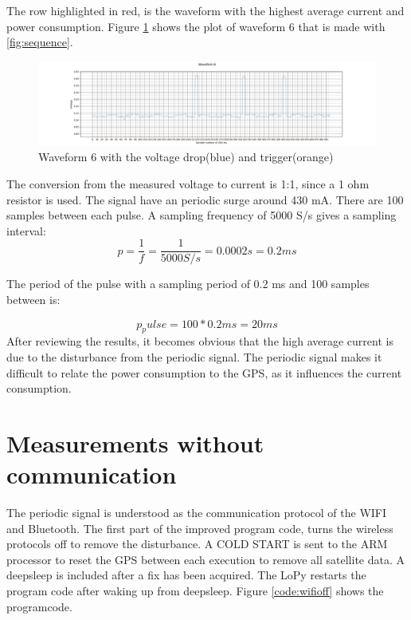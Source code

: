 The row highlighted in red, is the waveform with the highest average current and power consumption.
Figure \ref{fig:startup_intial} shows the plot of waveform 6 that is made with \ref{fig:sequence}.


 \begin{figure}[H]
\centering
\includegraphics[width=18 cm]{Project_Report/Images/startup_intial.PNG}
\caption{Waveform 6 with the voltage drop(blue) and trigger(orange)}
\label{fig:startup_intial}
\end{figure}

 The conversion from the measured voltage to current is 1:1, since a 1 ohm resistor is used. The signal have an periodic surge around 430 mA. There are 100 samples between each pulse. A sampling frequency of 5000 S/s gives a sampling interval:
 \begin{equation}
     p= \frac{1}{f} = \frac{1}{5000S/s}= 0.0002 s = 0.2 ms 
 \end{equation}
 
 The period of the pulse with a sampling period of 0.2 ms and 100 samples between is:
 
 \begin{equation}
     p_pulse = 100*0.2 ms = 20 ms
 \end{equation}
 After reviewing the results, it becomes obvious that the high average current is due to the disturbance from the periodic signal. The periodic signal makes it difficult to relate the power consumption to the GPS, as it influences the current consumption.


\section{Measurements without communication}

The periodic signal is understood as the communication protocol of the WIFI and Bluetooth. The first part of the improved program code, turns the wireless protocols off to remove the disturbance. A COLD START is sent to the ARM processor to reset the GPS between each execution to remove all satellite data. A deepsleep is included after a fix has been acquired. The LoPy restarts the program code after waking up from deepsleep. Figure \ref{code:wifioff} shows the programcode.

